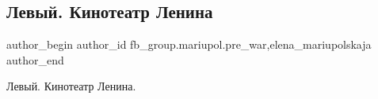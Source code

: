  
 
 
 
 

\subsection{Левый. Кинотеатр Ленина}
\label{sec:27_01_2023.fb.fb_group.mariupol.pre_war.2.levii__kinoteatr_len}
 
\ifcmt
 author_begin
   author_id fb_group.mariupol.pre_war,elena_mariupolskaja
 author_end
\fi

Левый. Кинотеатр Ленина.
